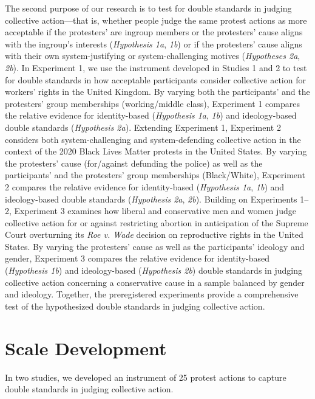 \documentclass[12pt, letterpaper]{article}
\begin{document}
The second purpose of our research is to test for double standards in
judging collective action---that is, whether people judge the same
protest actions as more acceptable if the protesters' are ingroup
members or the protesters' cause aligns with the ingroup's interests
(\emph{Hypothesis 1a}, \emph{1b}) or if the protesters' cause aligns
with their own system-justifying or system-challenging motives
(\emph{Hypotheses 2a}, \emph{2b}). In Experiment 1, we use the
instrument developed in Studies 1 and 2 to test for double standards in
how acceptable participants consider collective action for workers'
rights in the United Kingdom. By varying both the participants' and the
protesters' group memberships (working/middle class), Experiment 1
compares the relative evidence for identity-based (\emph{Hypothesis 1a},
\emph{1b}) and ideology-based double standards (\emph{Hypothesis 2a}).
Extending Experiment 1, Experiment 2 considers both system-challenging
and system-defending collective action in the context of the 2020 Black
Lives Matter protests in the United States. By varying the protesters'
cause (for/against defunding the police) as well as the participants'
and the protesters' group memberships (Black/White), Experiment 2
compares the relative evidence for identity-based (\emph{Hypothesis 1a},
\emph{1b}) and ideology-based double standards (\emph{Hypothesis 2a},
\emph{2b}). Building on Experiments 1--2, Experiment 3 examines how
liberal and conservative men and women judge collective action for or
against restricting abortion in anticipation of the Supreme Court
overturning its \emph{Roe v. Wade} decision on reproductive rights in
the United States. By varying the protesters' cause as well as the
participants' ideology and gender, Experiment 3 compares the relative
evidence for identity-based (\emph{Hypothesis 1b}) and ideology-based
(\emph{Hypothesis 2b}) double standards in judging collective action
concerning a conservative cause in a sample balanced by gender and
ideology. Together, the preregistered experiments provide a
comprehensive test of the hypothesized double standards in judging
collective action.

\hypertarget{scale-development}{%
\section{Scale Development}\label{scale-development}}

In two studies, we developed an instrument of 25 protest actions to
capture double standards in judging collective action.
\end{document}
